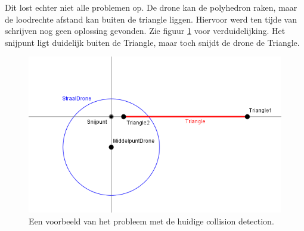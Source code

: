 
\noindent
Dit lost echter niet alle problemen op. De drone kan de polyhedron raken, maar de loodrechte afstand kan buiten de triangle liggen. Hiervoor werd ten tijde van schrijven nog geen oplossing gevonden. Zie figuur \ref{fig:CollisionDetectionProbleem} voor verduidelijking. Het snijpunt ligt duidelijk buiten de Triangle, maar toch snijdt de drone de Triangle.
\begin{figure}[h]
	\includegraphics[width=1\textwidth]{CollisionDetectionProbleem.png}
	\caption{Een voorbeeld van het probleem met de huidige collision detection.\\ }
	\label{fig:CollisionDetectionProbleem}
\end{figure}